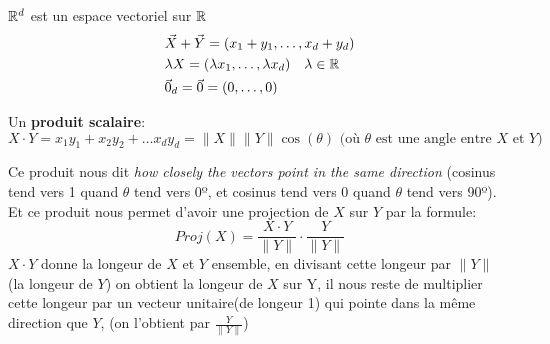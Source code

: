 \begin{definition}
    $\mathbb{R}^d$ est un espace vectoriel sur  $\mathbb{R}$ 
    \begin{align*}
        &\vec{X} + \vec{Y} = (x_1 + y_1, \ldots, x_d + y_d)\\
        &\lambda X = (\lambda x_1, \ldots, \lambda x_d) \quad \lambda \in \mathbb{R}\\
        &\vec{0}_d = \vec{0} = (0, \ldots, 0)
    \end{align*}
\end{definition}
\begin{definition}\label{def:prod_scalaire}
    Un \textbf{produit scalaire}:
    \[
    X \cdot Y = x_1y_1 + x_2y_2 + \ldots x_dy_d = \|X\|\|Y\|\cos(\theta) \text{ (où } \theta \text{ est une angle entre } X \text{ et } Y \text{)}
    \] 
\end{definition}
\begin{intuition}
    Ce produit nous dit \textit{how closely the vectors point in the same direction} (cosinus tend vers 1 quand $\theta$ tend vers 0º, et cosinus tend vers 0 quand  $\theta$ tend vers 90º). Et ce produit nous permet d'avoir une projection de $X$ sur $Y$ par la formule:
    \[
    Proj(X) = \frac{X \cdot Y}{\|Y\|} \cdot \frac{Y}{\|Y\|}
    \] 
    $X \cdot Y$ donne la longeur de  $X$ et  $Y$ ensemble, en divisant cette longeur par  $\|Y\|$ (la longeur de $Y$) on obtient la longeur de $X$ sur Y, il nous reste de multiplier cette longeur par un vecteur unitaire(de longeur 1) qui pointe dans la même direction que  $Y$, (on l'obtient par $\frac{Y}{\|Y\|}$)
   \begin{center}
   \end{center}
\end{intuition}
